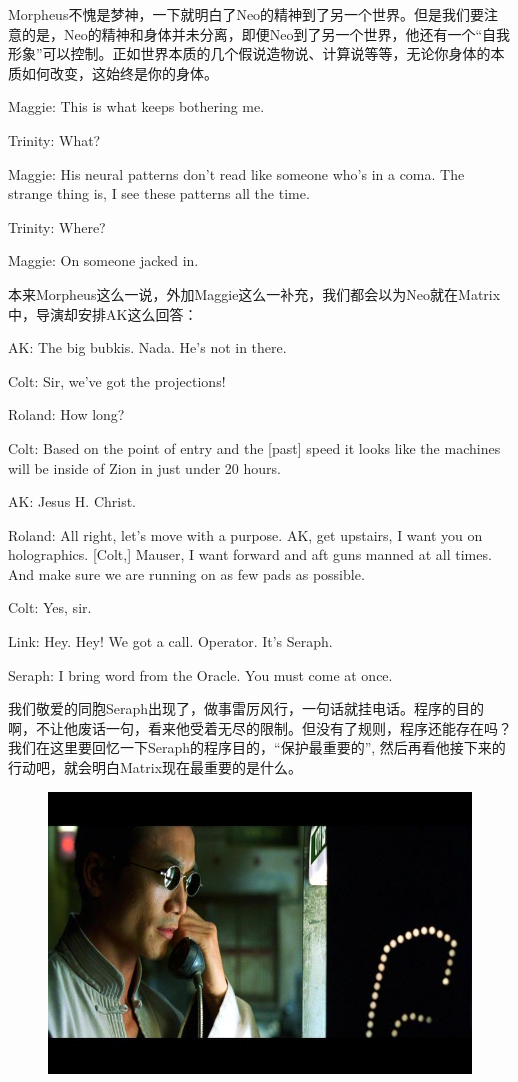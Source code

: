 \documentclass[UTF8]{ctexart}
\newenvironment{myquote}{\color{green} \setlength{\leftskip}{6em} \setlength{\rightskip}{4em} \setlength{\parindent}{-2em}}{\par}
\begin{document}
Morpheus不愧是梦神，一下就明白了Neo的精神到了另一个世界。但是我们要注意的是，Neo的精神和身体并未分离，即便Neo到了另一个世界，他还有一个“自我形象”可以控制。正如世界本质的几个假说造物说、计算说等等，无论你身体的本质如何改变，这始终是你的身体。

\begin{myquote}
Maggie: This is what keeps bothering me.

Trinity: What?

Maggie: His neural patterns don't read like someone who's in a coma. The strange thing is, I see these patterns all the time.

Trinity: Where?

Maggie: On someone jacked in.
\end{myquote}

本来Morpheus这么一说，外加Maggie这么一补充，我们都会以为Neo就在Matrix中，导演却安排AK这么回答：

\begin{myquote}
AK: The big bubkis. Nada. He's not in there.

Colt: Sir, we've got the projections!

Roland: How long?

Colt: Based on the point of entry and the [past] speed it looks like the machines will be inside of Zion in just under 20 hours.

AK: Jesus H. Christ.

Roland: All right, let's move with a purpose. AK, get upstairs, I want you on holographics. [Colt,] Mauser, I want forward and aft guns manned at all times. And make sure we are running on as few pads as possible.

Colt: Yes, sir.

Link: Hey. Hey! We got a call. Operator. It's Seraph.

Seraph: I bring word from the Oracle. You must come at once.
\end{myquote}

我们敬爱的同胞Seraph出现了，做事雷厉风行，一句话就挂电话。程序的目的啊，不让他废话一句，看来他受着无尽的限制。但没有了规则，程序还能存在吗？我们在这里要回忆一下Seraph的程序目的，“保护最重要的”, 然后再看他接下来的行动吧，就会明白Matrix现在最重要的是什么。

\begin{figure}[htb]
\centering
\includegraphics[width=0.5\linewidth]{fig/1f716227f5c3fe03918f9d12.jpg}
\end{figure}
\end{document}
